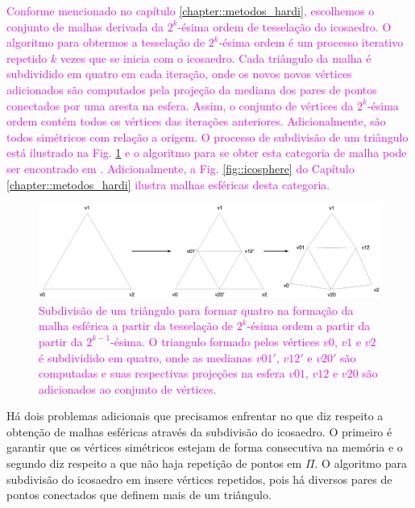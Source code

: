 \textcolor{magenta}{
Conforme mencionado no capítulo \ref{chapter::metodos_hardi}, escolhemos o conjunto de malhas derivada da $2^k$-ésima ordem de tesselação do icosaedro. O algoritmo para obtermos a tesselação de $2^k$-ésima ordem é um processo iterativo repetido $k$ vezes que se inicia com o icosaedro. Cada triângulo da malha é subdividido em quatro em cada iteração, onde os novos novos vértices adicionados são computados pela projeção da mediana dos pares de pontos conectados por uma aresta na esfera. Assim, o conjunto de vértices da $2^k$-ésima ordem contém todos os vértices das iterações anteriores. Adicionalmente, são todos simétricos com relação a origem. O processo de subdivisão de um triângulo está ilustrado na Fig. \ref{fig::triangle_icosahedron} e o algoritmo para se obter esta categoria de malha pode ser encontrado em . Adicionalmente, a Fig. \ref{fig::icosphere} do Capítulo \ref{chapter::metodos_hardi} ilustra malhas esféricas desta categoria.
}

\textcolor{magenta}{
\begin{figure}[htb]
    \centering
    \includegraphics[width=1.0\linewidth, angle=0]{figs/Esquema_Glifo/ico_subdivision.png}
    \caption{
    Subdivisão de um triângulo para formar quatro na formação da malha esférica a partir da tesselação de $2^k$-ésima ordem a partir da partir da $2^{k-1}$-ésima. O triangulo formado pelos vértices $v0$, $v1$ e $v2$ é subdividido em quatro, onde as medianas  $v01'$, $v12'$ e $v20'$ são computadas e suas respectivas projeções na esfera $v01$, $v12$ e $v20$ são adicionados ao conjunto de vértices.
    }
    \label{fig::triangle_icosahedron}
\end{figure}
}

Há dois problemas adicionais que precisamos enfrentar no que diz respeito a obtenção de malhas esféricas através da subdivisão do icosaedro. O primeiro é garantir que os vértices simétricos estejam de forma consecutiva na memória e o segundo diz respeito a que não haja repetição de pontos em $\Pi$. O algoritmo para subdivisão do icosaedro em  insere vértices repetidos, pois há diversos pares de pontos conectados que definem mais de um triângulo.

